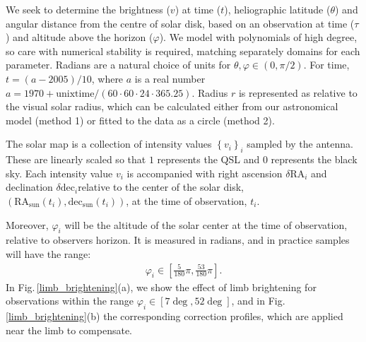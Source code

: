 \documentclass{aa}
\newcommand{\eqnl}[2]{\begin{eqnarray}\label{#1}#2\end{eqnarray}}
\begin{document}
We seek to determine the brightness ($v$) at time ($t$), heliographic latitude
($\theta$) and angular distance from the centre of solar disk, based on an
observation at time ($\tau$) and altitude above the horizon ($\varphi$).
We model with polynomials of high degree, so care with numerical stability is 
required, matching separately domains for each parameter.
Radians are a natural choice of units for $\theta, \varphi \in \left( 0, \pi/2 
\right)$. For time, $t = (a - 2005)/10$, where $a$ is a real number $a = 1970 +
\mathrm{unixtime}/(60\cdot60\cdot24\cdot365.25)$. Radius $r$ is represented as
relative to the visual solar radius, which can be calculated either from our
astronomical model (method 1) or fitted to the data as a circle (method 2).

The solar map is a collection of intensity values $\left\{ v_i \right\}_i$ 
sampled by the antenna.
These are linearly scaled so that $1$ represents the QSL and $0$ represents
the black sky.
Each intensity value $v_i$ is accompanied with right ascension $\delta \mathrm{RA}_i$ and declination $\delta 
\mathrm{dec}_i$relative to the center of the solar disk, $\left( \mathrm{RA}_{\mathrm{sun}}(t_i), 
\mathrm{dec}_{\mathrm{sun}}(t_i) \right)$, at the time of observation, $t_i$.


Moreover, $\varphi_i$ will be the altitude of the solar center at the time of observation, relative 
to observers horizon. It is measured in radians, and in practice samples will have the range:
\eqnl{altitude_range}{
\varphi_i \in \left[ \frac{5}{180} \pi, \frac{53}{180} \pi \right] \text{.}
}
In Fig.\,\ref{limb_brightening}(a), we show the effect of limb brightening for
observations within the range $\varphi_i\in[7\deg,52\deg]$, and in
Fig.\,\ref{limb_brightening}(b) the corresponding correction profiles, which 
are applied near the limb to compensate.
\end{document}
